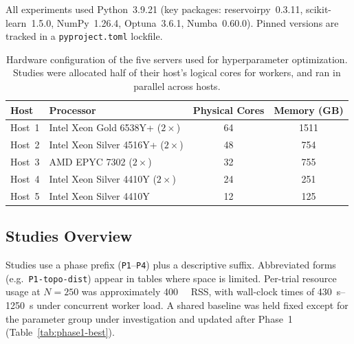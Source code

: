 \documentclass[journal=asbcd6,manuscript=suppinfo]{achemso}
\begin{document}
All experiments used Python~3.9.21 (key packages: reservoirpy~0.3.11, scikit-learn~1.5.0, NumPy~1.26.4, Optuna~3.6.1, Numba~0.60.0). 
Pinned versions are tracked in a \texttt{pyproject.toml} lockfile.

\begin{table}[H]
    \centering
    \caption{Hardware configuration of the five servers used for hyperparameter optimization. 
    Studies were allocated half of their host's logical cores for workers, and ran in parallel across hosts.}
    \label{tab:hardware}
    \small
    \begin{tabular}{llcc}
        \toprule
        Host & Processor & Physical Cores & Memory (GB) \\
        \midrule
        Host~1 & Intel Xeon Gold 6538Y+ ($2\times$) & 64 & 1511 \\
        Host~2 & Intel Xeon Silver 4516Y+ ($2\times$) & 48 & 754 \\
        Host~3 & AMD EPYC 7302 ($2\times$) & 32 & 755 \\
        Host~4 & Intel Xeon Silver 4410Y ($2\times$) & 24 & 251 \\
        Host~5 & Intel Xeon Silver 4410Y & 12 & 125 \\
    \bottomrule
    \end{tabular}
\end{table}

\subsection{Studies Overview}

Studies use a phase prefix (\texttt{P1}--\texttt{P4}) plus a descriptive suffix.
Abbreviated forms (e.g.\ \texttt{P1-topo-dist}) appear in tables where space is limited.
Per-trial resource usage at $N = 250$ was approximately \SI{400}{\mega\byte} RSS, with wall-clock times of \SI{430}{\second}--\SI{1250}{\second} under concurrent worker load.
A shared baseline was held fixed except for the parameter group under investigation and updated after Phase~1 (Table~\ref{tab:phase1-best}).
\end{document}
